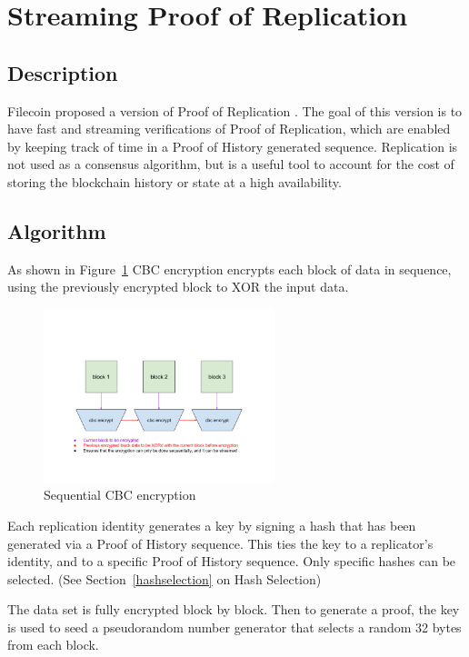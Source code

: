 \documentclass[12pt]{article}
\begin{document}
\section{Streaming Proof of Replication}\label{porep}
\subsection{Description}
Filecoin proposed a version of Proof of Replication \cite{filecoinporep}. The goal of this version is to have fast and streaming verifications of Proof of Replication, which are enabled by keeping track of time in a Proof of History generated sequence. Replication is not used as a consensus algorithm, but is a useful tool to account for the cost of storing the blockchain history or state at a high availability.
\subsection{Algorithm}
As shown in Figure~\ref{fig:encrypt} CBC encryption encrypts each block of data in sequence, using the previously encrypted block to XOR the input data.

\begin{figure}
  \begin{center}
    \centering
    \includegraphics[width=0.6\textwidth]{figures/fig_7.png}
    \caption[Fig 7]{Sequential CBC encryption\label{fig:encrypt}}
  \end{center}
  \end{figure}

Each replication identity generates a key by signing a hash that has been generated via a Proof of History sequence. This ties the key to a replicator’s identity, and to a specific Proof of History sequence. Only specific hashes can be selected. (See Section~\ref{hashselection} on Hash Selection)

The data set is fully encrypted block by block. Then to generate a proof, the key is used to seed a pseudorandom number generator that selects a random 32 bytes from each block.
\end{document}
